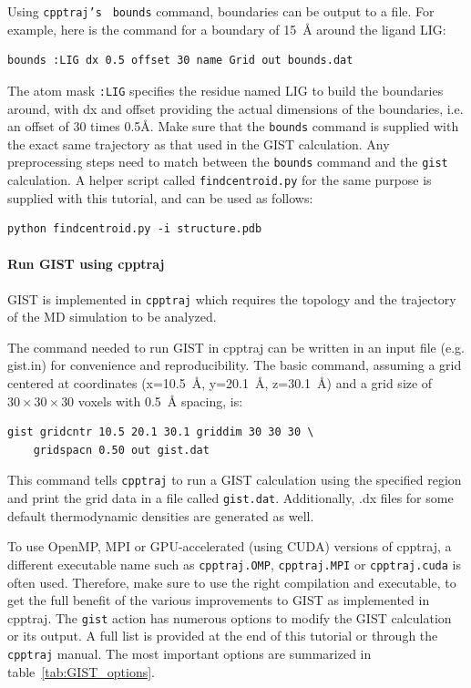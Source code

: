 \documentclass[9pt,tutorial,pubversion]{livecoms}
\newcommand{\software}{\texttt}
\newcommand\inlinecode{\texttt}
\begin{document}
Using \inlinecode{cpptraj's } \inlinecode{bounds} command, boundaries can be output to a file. 
For example, here is the command for a boundary of \qty{15}{\angstrom} around the ligand LIG:
\begin{lstlisting}[style=cpptraj]
bounds :LIG dx 0.5 offset 30 name Grid out bounds.dat
\end{lstlisting}
The atom mask \inlinecode{:LIG} specifies the residue named LIG to build the boundaries around, with dx and offset providing the actual dimensions of the boundaries, i.e. an offset of 30 times 0.5Å.
Make sure that the \inlinecode{bounds} command is supplied with the exact same trajectory as that used in the GIST calculation. 
Any preprocessing steps need to match between the \inlinecode{bounds} command and the \inlinecode{gist} calculation. 
A helper script called \inlinecode{findcentroid.py} for the same purpose is supplied with this tutorial, and can be used as follows:
\begin{lstlisting}[style=bash]
python findcentroid.py -i structure.pdb
\end{lstlisting}
\paragraph{Run GIST using cpptraj}
GIST is implemented in \software{cpptraj} which requires the topology and the trajectory of the MD simulation to be analyzed.

The command needed to run GIST in cpptraj can be written in an input file (e.g. gist.in) for convenience and reproducibility.
The basic command, assuming a grid centered at coordinates (x=\qty{10.5}{\angstrom}, y=\qty{20.1}{\angstrom}, z=\qty{30.1}{\angstrom}) and a grid size of $30\times30\times30$ voxels with \qty{0.5}{\angstrom} spacing, is:

\begin{lstlisting}[style=cpptraj]
gist gridcntr 10.5 20.1 30.1 griddim 30 30 30 \
	gridspacn 0.50 out gist.dat
\end{lstlisting}
This command tells \software{cpptraj} to run a GIST calculation using the specified region and print the grid data in a file called \inlinecode{gist.dat}.
Additionally, .dx files for some default thermodynamic densities are generated as well.

To use OpenMP, MPI or GPU-accelerated (using CUDA) versions of cpptraj, a different executable name such as \inlinecode{cpptraj.OMP}, \inlinecode{cpptraj.MPI} or \inlinecode{cpptraj.cuda} is often used.
Therefore, make sure to use the right compilation and executable, to get the full benefit of the various improvements to GIST as implemented in cpptraj.
The \inlinecode{gist} action has numerous options to modify the GIST calculation or its output.
A full list is provided at the end of this tutorial or through the \software{cpptraj} manual.
The most important options are summarized in table~\ref{tab:GIST_options}.
\end{document}
